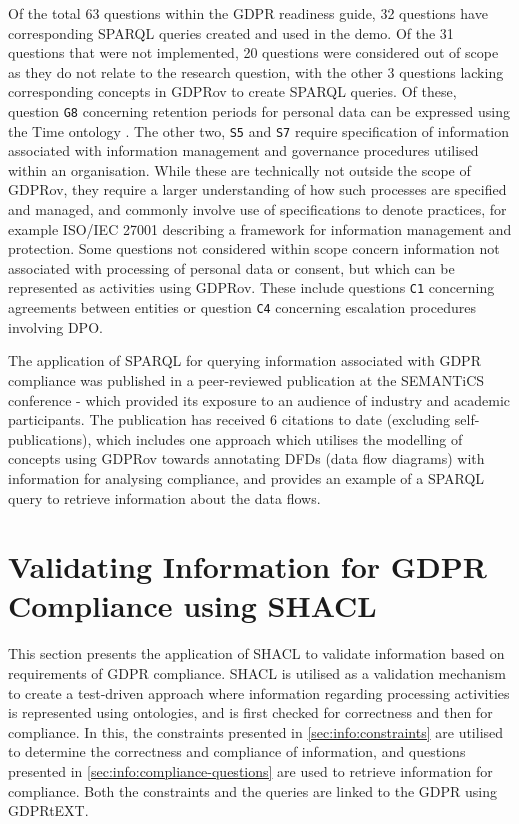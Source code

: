Of the total 63 questions within the GDPR readiness guide, 32 questions have corresponding SPARQL queries created and used in the demo.
Of the 31 questions that were not implemented, 20 questions were considered out of scope as they do not relate to the research question, with the other 3 questions lacking corresponding concepts in GDPRov to create SPARQL queries.
Of these, question \texttt{G8} concerning retention periods for personal data can be expressed using the Time ontology \cite{cox_time_2017}.
The other two, \texttt{S5} and \texttt{S7} require specification of information associated with information management and governance procedures utilised within an organisation. While these are technically not outside the scope of GDPRov, they require a larger understanding of how such processes are specified and managed, and commonly involve use of specifications to denote practices, for example ISO/IEC 27001 describing a framework for information management and protection.
Some questions not considered within scope concern information not associated with processing of personal data or consent, but which can be represented as activities using GDPRov. These include questions \texttt{C1} concerning agreements between entities or question \texttt{C4} concerning escalation procedures involving DPO.

The application of SPARQL for querying information associated with GDPR compliance was published in a peer-reviewed publication \cite{pandit_queryable_2018} at the SEMANTiCS conference - which provided its exposure to an audience of industry and academic participants. The publication has received 6 citations to date (excluding self-publications), which includes one approach \cite{debruyneOntologyRepresentingAnnotating2019} which utilises the modelling of concepts using GDPRov towards annotating DFDs (data flow diagrams) with information for analysing compliance, and provides an example of a SPARQL query to retrieve information about the data flows.


\section{Validating Information for GDPR Compliance using SHACL}\label{sec:testing:shacl}
This section presents the application of SHACL to validate information based on requirements of GDPR compliance.
SHACL is utilised as a validation mechanism to create a test-driven approach where information regarding processing activities is represented using ontologies, and is first checked for correctness and then for compliance.
In this, the constraints presented in \autoref{sec:info:constraints} are utilised to determine the correctness and compliance of information, and questions presented in \autoref{sec:info:compliance-questions} are used to retrieve information for compliance.
Both the constraints and the queries are linked to the GDPR using GDPRtEXT.

